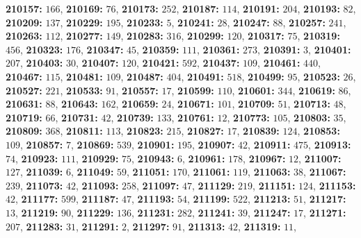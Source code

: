 \textsf{\bfseries 210157:} $166$, \textsf{\bfseries 210169:} $76$, \textsf{\bfseries 210173:} $252$, \textsf{\bfseries 210187:} $114$, \textsf{\bfseries 210191:} $204$, \textsf{\bfseries 210193:} $82$, \textsf{\bfseries 210209:} $137$, \textsf{\bfseries 210229:} $195$, \textsf{\bfseries 210233:} $5$, \textsf{\bfseries 210241:} $28$, \textsf{\bfseries 210247:} $88$, \textsf{\bfseries 210257:} $241$, \textsf{\bfseries 210263:} $112$, \textsf{\bfseries 210277:} $149$, \textsf{\bfseries 210283:} $316$, \textsf{\bfseries 210299:} $120$, \textsf{\bfseries 210317:} $75$, \textsf{\bfseries 210319:} $456$, \textsf{\bfseries 210323:} $176$, \textsf{\bfseries 210347:} $45$, \textsf{\bfseries 210359:} $111$, \textsf{\bfseries 210361:} $273$, \textsf{\bfseries 210391:} $3$, \textsf{\bfseries 210401:} $207$, \textsf{\bfseries 210403:} $30$, \textsf{\bfseries 210407:} $120$, \textsf{\bfseries 210421:} $592$, \textsf{\bfseries 210437:} $109$, \textsf{\bfseries 210461:} $440$, \textsf{\bfseries 210467:} $115$, \textsf{\bfseries 210481:} $109$, \textsf{\bfseries 210487:} $404$, \textsf{\bfseries 210491:} $518$, \textsf{\bfseries 210499:} $95$, \textsf{\bfseries 210523:} $26$, \textsf{\bfseries 210527:} $221$, \textsf{\bfseries 210533:} $91$, \textsf{\bfseries 210557:} $17$, \textsf{\bfseries 210599:} $110$, \textsf{\bfseries 210601:} $344$, \textsf{\bfseries 210619:} $86$, \textsf{\bfseries 210631:} $88$, \textsf{\bfseries 210643:} $162$, \textsf{\bfseries 210659:} $24$, \textsf{\bfseries 210671:} $101$, \textsf{\bfseries 210709:} $51$, \textsf{\bfseries 210713:} $48$, \textsf{\bfseries 210719:} $66$, \textsf{\bfseries 210731:} $42$, \textsf{\bfseries 210739:} $133$, \textsf{\bfseries 210761:} $12$, \textsf{\bfseries 210773:} $105$, \textsf{\bfseries 210803:} $35$, \textsf{\bfseries 210809:} $368$, \textsf{\bfseries 210811:} $113$, \textsf{\bfseries 210823:} $215$, \textsf{\bfseries 210827:} $17$, \textsf{\bfseries 210839:} $124$, \textsf{\bfseries 210853:} $109$, \textsf{\bfseries 210857:} $7$, \textsf{\bfseries 210869:} $539$, \textsf{\bfseries 210901:} $195$, \textsf{\bfseries 210907:} $42$, \textsf{\bfseries 210911:} $475$, \textsf{\bfseries 210913:} $74$, \textsf{\bfseries 210923:} $111$, \textsf{\bfseries 210929:} $75$, \textsf{\bfseries 210943:} $6$, \textsf{\bfseries 210961:} $178$, \textsf{\bfseries 210967:} $12$, \textsf{\bfseries 211007:} $127$, \textsf{\bfseries 211039:} $6$, \textsf{\bfseries 211049:} $59$, \textsf{\bfseries 211051:} $170$, \textsf{\bfseries 211061:} $119$, \textsf{\bfseries 211063:} $38$, \textsf{\bfseries 211067:} $239$, \textsf{\bfseries 211073:} $42$, \textsf{\bfseries 211093:} $258$, \textsf{\bfseries 211097:} $47$, \textsf{\bfseries 211129:} $219$, \textsf{\bfseries 211151:} $124$, \textsf{\bfseries 211153:} $42$, \textsf{\bfseries 211177:} $599$, \textsf{\bfseries 211187:} $47$, \textsf{\bfseries 211193:} $54$, \textsf{\bfseries 211199:} $522$, \textsf{\bfseries 211213:} $51$, \textsf{\bfseries 211217:} $13$, \textsf{\bfseries 211219:} $90$, \textsf{\bfseries 211229:} $136$, \textsf{\bfseries 211231:} $282$, \textsf{\bfseries 211241:} $39$, \textsf{\bfseries 211247:} $17$, \textsf{\bfseries 211271:} $207$, \textsf{\bfseries 211283:} $31$, \textsf{\bfseries 211291:} $2$, \textsf{\bfseries 211297:} $91$, \textsf{\bfseries 211313:} $42$, \textsf{\bfseries 211319:} $11$, 
